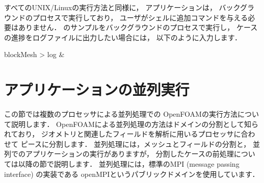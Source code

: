 すべてのUNIX/Linuxの実行方法と同様に，
アプリケーションは，
%
%
バックグラウンドのプロセスで実行しており，
ユーザがシェルに追加コマンドを与える必要はありません．
のサンプルをバックグラウンドのプロセスで実行し，
ケースの進捗をログファイルに出力したい場合には，
以下のように入力します．
\begin{OFverbatim}[terminal]
blockMesh > log &
\end{OFverbatim}



\section{アプリケーションの並列実行}
\label{sec:3.4}
%
%
この節では複数のプロセッサによる並列処理での
OpenFOAMの実行方法について説明します．
OpenFOAMによる並列処理の方法はドメインの分割として知られており，
ジオメトリと関連したフィールドを解析に用いるプロセッサに合わせて
ピースに分割します．
並列処理には，メッシュとフィールドの分割と，
並列でのアプリケーションの実行がありますが，
分割したケースの前処理については以降の節で説明します．
並列処理には，標準のMPI (message passing interface) の実装である
openMPIというパブリックドメインを使用しています．


